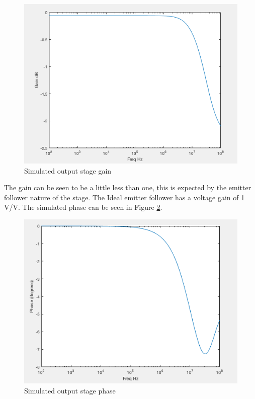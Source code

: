 \begin{figure}[H]
	\begin{center}
		\includegraphics[scale=.40]{Simulations/gainlaststage.png}
		\caption{Simulated output stage gain}
		\label{fig:outputgain}
	\end{center}
\end{figure} 

The gain can be seen to be a little less than one, this is expected by the emitter follower nature of the stage. The Ideal emitter follower has a voltage gain of 1 V/V. The simulated phase can be seen in Figure \ref{fig:outputphase}.

\begin{figure}[H]
	\begin{center}
		\includegraphics[scale=.40]{Simulations/phaselaststage.png}
		\caption{Simulated output stage phase}
		\label{fig:outputphase}
	\end{center}
\end{figure} 

